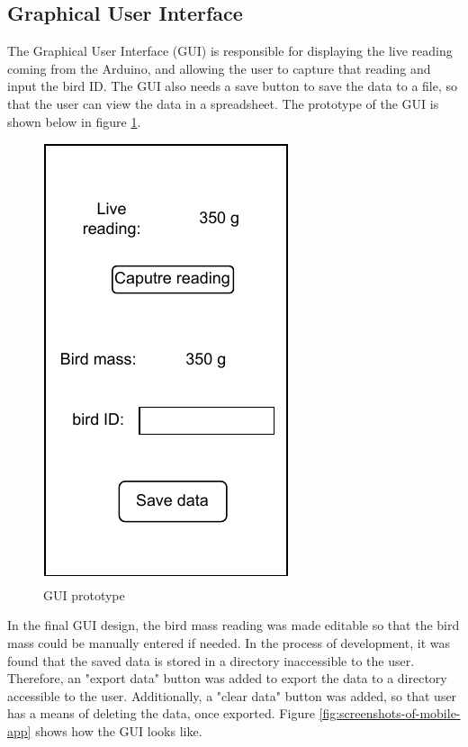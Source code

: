 \documentclass[class=report,11pt,crop=false]{standalone}
\begin{document}
		
		
		\subsection{Graphical User Interface}
			
			The Graphical User Interface (GUI) is responsible for displaying the live reading coming from the Arduino, and allowing the user to capture that reading and input the bird ID. The GUI also needs a save button to save the data to a file, so that the user can view the data in a spreadsheet.
			The prototype of the GUI is shown below in figure \ref{fig:gui-prototype}.
			
			\begin{figure}[h!]
				\centering
				\includegraphics[scale=1]{"Figures/GUI prototype"}
				\caption{GUI prototype}
				\label{fig:gui-prototype}
			\end{figure}
		
			In the final GUI design, the bird mass reading was made editable so that the bird mass could be manually entered if needed.
			In the process of development, it was found that the saved data is stored in a directory inaccessible to the user. Therefore, an "export data" button was added to export the data to a directory accessible to the user. Additionally, a "clear data" button was added, so that user has a means of deleting the data, once exported. 
			Figure \ref{fig:screenshots-of-mobile-app} shows how the GUI looks like.
			
\end{document}
